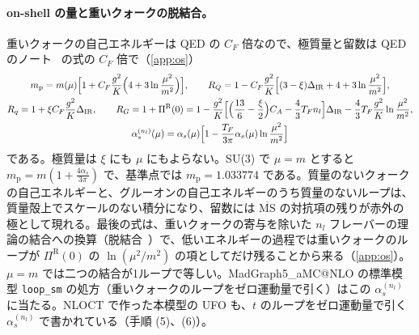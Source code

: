 \documentclass[a4paper,10pt]{ltjsarticle}
\newcommand{\MSbar}{\overline{\mathrm{MS}}}
\newcommand{\DIR}{\Delta_{\mathrm{IR}}}
\begin{document}
\paragraph{on-shell の量と重いクォークの脱結合。}重いクォークの自己エネルギーは QED の $C_F$ 倍なので、極質量と留数は QED のノート~\cite{qednote} の式の $C_F$ 倍で（\ref{app:os}）
\begin{equation}
\begin{gathered}
m_{\mathrm p}=m(\mu)\Bigl[1+C_F\frac{g^2}{K}\Bigl(4+3\ln\frac{\mu^2}{m^2}\Bigr)\Bigr],\qquad
R_Q=1-C_F\frac{g^2}{K}\Bigl[(3-\xi)\DIR+4+3\ln\frac{\mu^2}{m^2}\Bigr],\\
R_q=1+\xi C_F\frac{g^2}{K}\DIR,\qquad
R_G=1+\Pi^{\mathrm R}(0)=1-\frac{g^2}{K}\Bigl[\Bigl(\frac{13}6-\frac\xi2\Bigr)C_A-\frac43T_Fn_l\Bigr]\DIR-\frac43T_F\frac{g^2}K\ln\frac{\mu^2}{m^2},\\
\alpha_s^{(n_l)}(\mu)=\alpha_s(\mu)\Bigl[1-\frac{T_F}{3\pi}\alpha_s(\mu)\ln\frac{\mu^2}{m^2}\Bigr]
\end{gathered}
\label{eq:os}
\end{equation}
である。極質量は $\xi$ にも $\mu$ にもよらない。SU(3) で $\mu=m$ とすると $m_{\mathrm p}=m(1+\frac{4\alpha_s}{3\pi})$ で、基準点では $m_{\mathrm p}=1.033774$ である。質量のないクォークの自己エネルギーと、グルーオンの自己エネルギーのうち質量のないループは、質量殻上でスケールのない積分になり、留数には $\MSbar$ の対抗項の残りが赤外の極として現れる。最後の式は、重いクォークの寄与を除いた $n_l$ フレーバーの理論の結合への換算（脱結合~\cite{ac75,weinberg73,bw82}）で、低いエネルギーの過程では重いクォークのループが $\Pi^{\mathrm R}(0)$ の $\ln(\mu^2/m^2)$ の項としてだけ残ることから来る（\ref{app:os}）。$\mu=m$ では二つの結合が1ループで等しい。MadGraph5\_aMC@NLO の標準模型 \texttt{loop\_sm} の処方（重いクォークのループをゼロ運動量で引く）はこの $\alpha_s^{(n_l)}$ に当たる。NLOCT で作った本模型の UFO も、$t$ のループをゼロ運動量で引く $\alpha_s^{(n_l)}$ で書かれている（手順 (5)、(6)）。
\end{document}
